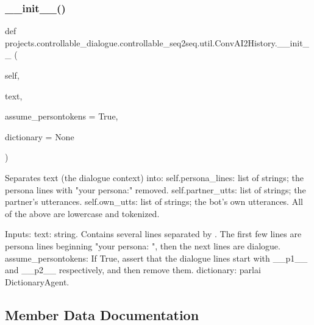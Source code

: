 \subsubsection{\texorpdfstring{\+\_\+\+\_\+init\+\_\+\+\_\+()}{\_\_init\_\_()}}
{\footnotesize\ttfamily def projects.\+controllable\+\_\+dialogue.\+controllable\+\_\+seq2seq.\+util.\+Conv\+A\+I2\+History.\+\_\+\+\_\+init\+\_\+\+\_\+ (\begin{DoxyParamCaption}\item[{}]{self,  }\item[{}]{text,  }\item[{}]{assume\+\_\+persontokens = {\ttfamily True},  }\item[{}]{dictionary = {\ttfamily None} }\end{DoxyParamCaption})}

\begin{DoxyVerb}Separates text (the dialogue context) into:
  self.persona_lines: list of strings; the persona lines with "your persona:"
    removed.
  self.partner_utts: list of strings; the partner's utterances.
  self.own_utts: list of strings; the bot's own utterances.
All of the above are lowercase and tokenized.

Inputs:
  text: string. Contains several lines separated by \n. The first few lines are
    persona lines beginning "your persona: ", then the next lines are dialogue.
  assume_persontokens: If True, assert that the dialogue lines start with
    __p1__ and __p2__ respectively, and then remove them.
  dictionary: parlai DictionaryAgent.
\end{DoxyVerb}
 

\subsection{Member Data Documentation}
\mbox{\label{classprojects_1_1controllable__dialogue_1_1controllable__seq2seq_1_1util_1_1ConvAI2History_a12340ae0e928a10c22ea9abfebf02b30}} 
